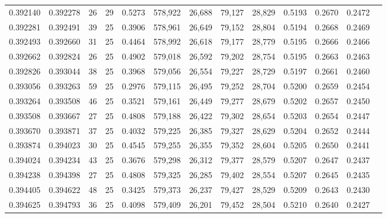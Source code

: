 \begin{tabular}{rrrrrrrrrrrrr}
0.392140 & 0.392278 &    26 &  29 &                                     0.5273 & 578,922 &  26,688 &  79,127 &  28,829 & 0.5193 & 0.2670 & 0.2472 \\
0.392281 & 0.392491 &    39 &  25 &                                     0.3906 & 578,961 &  26,649 &  79,152 &  28,804 & 0.5194 & 0.2668 & 0.2469 \\
0.392493 & 0.392660 &    31 &  25 &                                     0.4464 & 578,992 &  26,618 &  79,177 &  28,779 & 0.5195 & 0.2666 & 0.2466 \\
0.392662 & 0.392824 &    26 &  25 &                                     0.4902 & 579,018 &  26,592 &  79,202 &  28,754 & 0.5195 & 0.2663 & 0.2463 \\
0.392826 & 0.393044 &    38 &  25 &                                     0.3968 & 579,056 &  26,554 &  79,227 &  28,729 & 0.5197 & 0.2661 & 0.2460 \\
0.393056 & 0.393263 &    59 &  25 &                                     0.2976 & 579,115 &  26,495 &  79,252 &  28,704 & 0.5200 & 0.2659 & 0.2454 \\
0.393264 & 0.393508 &    46 &  25 &                                     0.3521 & 579,161 &  26,449 &  79,277 &  28,679 & 0.5202 & 0.2657 & 0.2450 \\
0.393508 & 0.393667 &    27 &  25 &                                     0.4808 & 579,188 &  26,422 &  79,302 &  28,654 & 0.5203 & 0.2654 & 0.2447 \\
0.393670 & 0.393871 &    37 &  25 &                                     0.4032 & 579,225 &  26,385 &  79,327 &  28,629 & 0.5204 & 0.2652 & 0.2444 \\
0.393874 & 0.394023 &    30 &  25 &                                     0.4545 & 579,255 &  26,355 &  79,352 &  28,604 & 0.5205 & 0.2650 & 0.2441 \\
0.394024 & 0.394234 &    43 &  25 &                                     0.3676 & 579,298 &  26,312 &  79,377 &  28,579 & 0.5207 & 0.2647 & 0.2437 \\
0.394238 & 0.394398 &    27 &  25 &                                     0.4808 & 579,325 &  26,285 &  79,402 &  28,554 & 0.5207 & 0.2645 & 0.2435 \\
0.394405 & 0.394622 &    48 &  25 &                                     0.3425 & 579,373 &  26,237 &  79,427 &  28,529 & 0.5209 & 0.2643 & 0.2430 \\
0.394625 & 0.394793 &    36 &  25 &                                     0.4098 & 579,409 &  26,201 &  79,452 &  28,504 & 0.5210 & 0.2640 & 0.2427 \\

\end{tabular}

